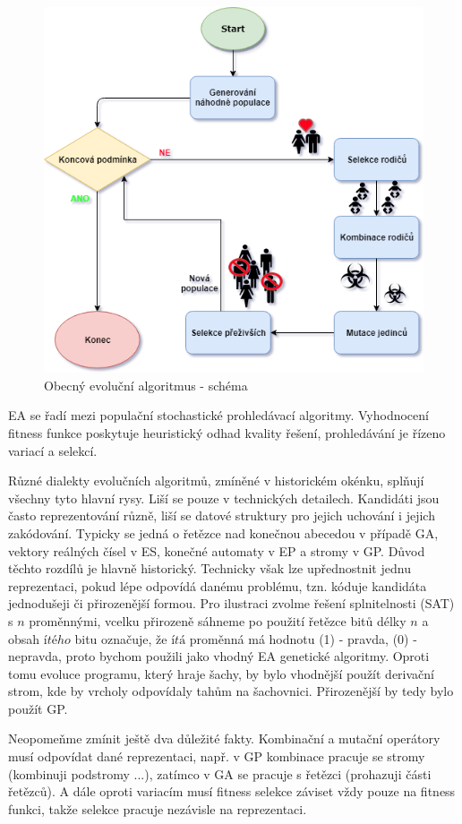 \begin{figure}[h]\centering
\includegraphics[scale=0.64]{../img/EA.png}
\caption{Obecný evoluční algoritmus - schéma}
\end{figure}
EA se řadí mezi populační stochastické prohledávací	algoritmy. Vyhodnocení fitness funkce poskytuje heuristický odhad kvality řešení, prohledávání je řízeno variací a selekcí. \par
Různé dialekty evolučních algoritmů, zmíněné v historickém okénku, splňují všechny tyto hlavní rysy. Liší se pouze v technických detailech. Kandidáti jsou často reprezentování různě, liší se datové struktury pro jejich uchování i jejich zakódování. Typicky se jedná o řetězce nad konečnou abecedou v případě GA, vektory reálných čísel v ES, konečné automaty v EP a stromy v GP. Důvod těchto rozdílů je hlavně historický. Technicky však lze upřednostnit jednu reprezentaci, pokud lépe odpovídá danému problému, tzn. kóduje kandidáta jednodušeji či přirozenější formou. Pro ilustraci zvolme řešení splnitelnosti (SAT) s $n$ proměnnými, vcelku přirozeně sáhneme po použití řetězce bitů délky $n$ a obsah $ítého$ bitu označuje, že $ítá$ proměnná má hodnotu (1) - pravda, (0) - nepravda, proto bychom použili jako vhodný EA genetické algoritmy. Oproti tomu evoluce programu, který hraje šachy, by bylo vhodnější použít derivační strom, kde by vrcholy odpovídaly tahům na šachovnici. Přirozenější by tedy bylo použít GP. \par
Neopomeňme zmínit ještě dva důležité fakty. Kombinační a mutační operátory musí odpovídat dané reprezentaci, např. v GP kombinace pracuje se stromy (kombinuji podstromy ...), zatímco v GA se pracuje s řetězci (prohazuji části řetězců). A dále oproti variacím musí fitness selekce záviset vždy pouze na fitness funkci, takže selekce pracuje nezávisle na reprezentaci.
